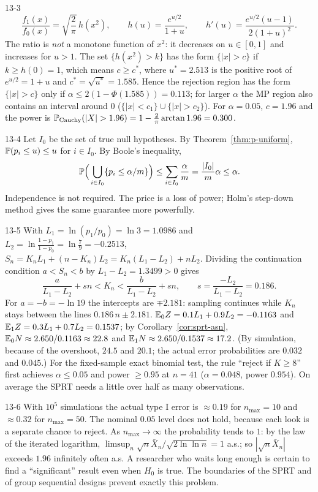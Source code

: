 \begin{solution}{13-3}
\[
\frac{f_1(x)}{f_0(x)}=\sqrt{\frac2\pi}\,h(x^2),\qquad h(u)=\frac{e^{u/2}}{1+u},\qquad h'(u)=\frac{e^{u/2}(u-1)}{2(1+u)^2}.
\]
The ratio is \emph{not} a monotone function of $x^2$: it decreases on $u\in[0,1]$ and increases for $u>1$. The set $\{h(x^2)>k\}$ has the form $\{|x|>c\}$ if $k\ge h(0)=1$, which means $c\ge c^*$, where $u^*=2.513$ is the positive root of $e^{u/2}=1+u$ and $c^*=\sqrt{u^*}=1.585$. Hence the rejection region has the form $\{|x|>c\}$ only if $\alpha\le2(1-\Phi(1.585))=0.113$; for larger $\alpha$ the MP region also contains an interval around $0$ ($\{|x|<c_1\}\cup\{|x|>c_2\}$). For $\alpha=0.05$, $c=1.96$ and the power is $\P_{\text{Cauchy}}(|X|>1.96)=1-\frac2\pi\arctan1.96=0.300$.
\end{solution}

\begin{solution}{13-4}
Let $I_0$ be the set of true null hypotheses. By Theorem~\ref{thm:p-uniform}, $\P(p_i\le u)\le u$ for $i\in I_0$. By Boole's inequality,
\[
\P\Big(\bigcup_{i\in I_0}\{p_i\le\alpha/m\}\Big)\le\sum_{i\in I_0}\frac\alpha m=\frac{|I_0|}{m}\alpha\le\alpha .
\]
Independence is not required. The price is a loss of power; Holm's step-down method gives the same guarantee more powerfully.
\end{solution}

\begin{solution}{13-5}
With $L_1=\ln(p_1/p_0)=\ln3=1.0986$ and $L_2=\ln\frac{1-p_1}{1-p_0}=\ln\frac79=-0.2513$, $S_n=K_nL_1+(n-K_n)L_2=K_n(L_1-L_2)+nL_2$. Dividing the continuation condition $a<S_n<b$ by $L_1-L_2=1.3499>0$ gives
\[
\frac{a}{L_1-L_2}+sn<K_n<\frac{b}{L_1-L_2}+sn,\qquad s=\frac{-L_2}{L_1-L_2}=0.186 .
\]
For $a=-b=-\ln19$ the intercepts are $\mp2.181$: sampling continues while $K_n$ stays between the lines $0.186\,n\pm2.181$. $\E_0Z=0.1L_1+0.9L_2=-0.1163$ and $\E_1Z=0.3L_1+0.7L_2=0.1537$; by Corollary~\ref{cor:sprt-asn}, $\E_0N\approx2.650/0.1163\approx22.8$ and $\E_1N\approx2.650/0.1537\approx17.2$. (By simulation, because of the overshoot, $24.5$ and $20.1$; the actual error probabilities are $0.032$ and $0.045$.) For the fixed-sample exact binomial test, the rule ``reject if $K\ge8$'' first achieves $\alpha\le0.05$ and power $\ge0.95$ at $n=41$ ($\alpha=0.048$, power $0.954$). On average the SPRT needs a little over half as many observations.
\end{solution}

\begin{solution}{13-6}
With $10^5$ simulations the actual type I error is $\approx0.19$ for $n_{\max}=10$ and $\approx0.32$ for $n_{\max}=50$. The nominal $0.05$ level does not hold, because each look is a separate chance to reject. As $n_{\max}\to\infty$ the probability tends to $1$: by the law of the iterated logarithm, $\limsup_n\sqrt n\bar X_n/\sqrt{2\ln\ln n}=1$ a.s.; so $|\sqrt n\bar X_n|$ exceeds $1.96$ infinitely often a.s. A researcher who waits long enough is certain to find a ``significant'' result even when $H_0$ is true. The boundaries of the SPRT and of group sequential designs prevent exactly this problem.
\end{solution}

